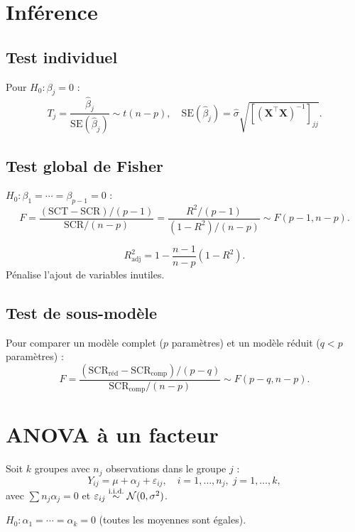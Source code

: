 \section{Inf\'erence}

\subsection{Test individuel}

Pour $H_0:\beta_j=0$ :
\[
T_j = \frac{\hat{\beta}_j}{\mathrm{SE}(\hat{\beta}_j)} \sim t(n-p), \quad \mathrm{SE}(\hat{\beta}_j)=\hat{\sigma}\sqrt{[(\mathbf{X}^\top\mathbf{X})^{-1}]_{jj}}.
\]

\subsection{Test global de Fisher}

$H_0:\beta_1=\cdots=\beta_{p-1}=0$ :
\[
F = \frac{(\mathrm{SCT}-\mathrm{SCR})/(p-1)}{\mathrm{SCR}/(n-p)} = \frac{R^2/(p-1)}{(1-R^2)/(n-p)} \sim F(p-1,n-p).
\]

\begin{definition}[$R^2$ ajust\'e]
\[
R^2_{\mathrm{adj}} = 1-\frac{n-1}{n-p}(1-R^2).
\]
P\'enalise l'ajout de variables inutiles.
\end{definition}

\subsection{Test de sous-mod\`ele}

Pour comparer un mod\`ele complet ($p$ param\`etres) et un mod\`ele r\'eduit ($q<p$ param\`etres) :
\[
F = \frac{(\mathrm{SCR}_{\text{r\'ed}}-\mathrm{SCR}_{\text{comp}})/(p-q)}{\mathrm{SCR}_{\text{comp}}/(n-p)} \sim F(p-q,n-p).
\]

\section{ANOVA \`a un facteur}

\begin{definition}
Soit $k$ groupes avec $n_j$ observations dans le groupe $j$ :
\[
Y_{ij} = \mu + \alpha_j + \varepsilon_{ij}, \quad i=1,\ldots,n_j,\; j=1,\ldots,k,
\]
avec $\sum n_j\alpha_j=0$ et $\varepsilon_{ij}\overset{\text{i.i.d.}}{\sim}\mathcal{N}(0,\sigma^2)$.

$H_0:\alpha_1=\cdots=\alpha_k=0$ (toutes les moyennes sont \'egales).
\end{definition}

